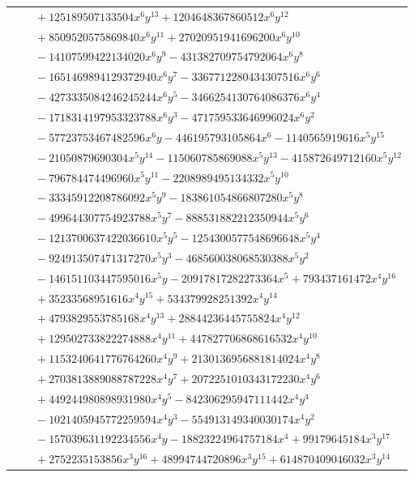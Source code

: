 \documentclass[11pt]{article}
\begin{document}
\begin{longtable}{@{}ll@{}}
 & $\quad +125189507133504x^{6}y^{13}+1204648367860512x^{6}y^{12}$\\
 & $\quad +8509520575869840x^{6}y^{11}+27020951941696200x^{6}y^{10}$\\
 & $\quad -14107599422134020x^{6}y^{9}-431382709754792064x^{6}y^{8}$\\
 & $\quad -1651469894129372940x^{6}y^{7}-3367712280434307516x^{6}y^{6}$\\
 & $\quad -4273335084246245244x^{6}y^{5}-3466254130764086376x^{6}y^{4}$\\
 & $\quad -1718314197953323788x^{6}y^{3}-471759533646996024x^{6}y^{2}$\\
 & $\quad -57723753467482596x^{6}y-446195793105864x^{6}-1140565919616x^{5}y^{15}$\\
 & $\quad -21050879690304x^{5}y^{14}-115060785869088x^{5}y^{13}-415872649712160x^{5}y^{12}$\\
 & $\quad -796784474496960x^{5}y^{11}-2208989495134332x^{5}y^{10}$\\
 & $\quad -33345912208786092x^{5}y^{9}-183861054866807280x^{5}y^{8}$\\
 & $\quad -499644307754923788x^{5}y^{7}-888531882212350944x^{5}y^{6}$\\
 & $\quad -1213700637422036610x^{5}y^{5}-1254300577548696648x^{5}y^{4}$\\
 & $\quad -924913507471317270x^{5}y^{3}-468560038068530388x^{5}y^{2}$\\
 & $\quad -146151103447595016x^{5}y-20917817282273364x^{5}+793437161472x^{4}y^{16}$\\
 & $\quad +35233568951616x^{4}y^{15}+534379928251392x^{4}y^{14}$\\
 & $\quad +4793829553785168x^{4}y^{13}+28844236445755824x^{4}y^{12}$\\
 & $\quad +129502733822274888x^{4}y^{11}+447827706868616532x^{4}y^{10}$\\
 & $\quad +1153240641776764260x^{4}y^{9}+2130136956881814024x^{4}y^{8}$\\
 & $\quad +2703813889088787228x^{4}y^{7}+2072251010343172230x^{4}y^{6}$\\
 & $\quad +449244980898931980x^{4}y^{5}-842306295947111442x^{4}y^{4}$\\
 & $\quad -1021405945772259594x^{4}y^{3}-554913149340030174x^{4}y^{2}$\\
 & $\quad -157039631192234556x^{4}y-18823224964757184x^{4}+99179645184x^{3}y^{17}$\\
 & $\quad +2752235153856x^{3}y^{16}+48994744720896x^{3}y^{15}+614870409046032x^{3}y^{14}$\\

\end{longtable}
\end{document}
